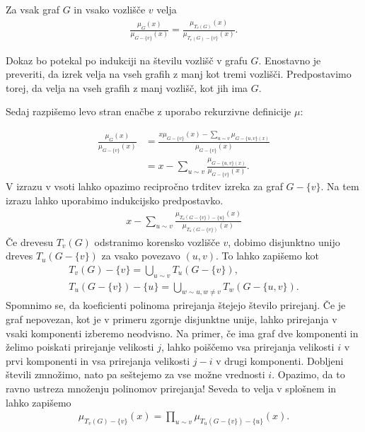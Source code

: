 \begin{lema}\label{lemarekurzpathdrevesa}
    Za vsak graf \(G\) in vsako vozlišče \(v\) velja
    \begin{align*}
        \frac{\mu_G(x)}{\mu_{G-\{v\}}(x)} = \frac{\mu_{T_v(G)}(x)}{\mu_{T_v(G)-\{v\}}(x)}.
    \end{align*}
\end{lema}
\begin{dokaz}
    Dokaz bo potekal po indukciji na številu vozlišč v grafu \(G\). Enostavno je preveriti, da izrek velja na vseh grafih z manj kot tremi vozlišči. Predpostavimo torej, da velja na vseh grafih z manj vozlišč, kot jih ima \(G\).

    Sedaj razpišemo levo stran enačbe z uporabo rekurzivne definicije \(\mu\):

    \begin{align*}
        \frac{\mu_G(x)}{\mu_{G-\{v\}}(x)} & = \frac{x \mu_{G-\{v\}}(x) - \sum_{u\sim v}\mu_{G-\{u, v\}(x)}}{\mu_{G-\{v\}}(x)} \\
                                          & = x - \sum_{u\sim v}\frac{\mu_{G-\{u, v\}(x)}}{\mu_{G-\{v\}}(x)}.
    \end{align*}
    V izrazu v vsoti lahko opazimo recipročno trditev izreka za graf \(G-\{v\}\). Na tem izrazu lahko uporabimo indukcijsko predpostavko.
    \begin{align}\label{lemamatching}
        x - \sum_{u\sim v}\frac{\mu_{T_u(G-\{v\}) - \{u\}}(x)}{\mu_{T_u(G-\{v\})}(x)}
    \end{align}
    Če drevesu \(T_v(G)\) odstranimo korensko vozlišče \(v\), dobimo disjunktno unijo dreves \(T_u(G-\{v\})\) za vsako povezavo \((u, v)\). To lahko zapišemo kot
    \begin{align*}
        T_v(G) - \{v\} = \bigcup_{u\sim v} T_u(G-\{v\}), \\
        T_u(G - \{v\}) - \{u\} = \bigcup_{w\sim u, w\neq v} T_w(G-\{u, v\}).
    \end{align*}
    Spomnimo se, da koeficienti polinoma prirejanja štejejo število prirejanj. Če je graf nepovezan, kot je v primeru zgornje disjunktne unije, lahko prirejanja v vsaki komponenti izberemo neodvisno. Na primer, če ima graf dve komponenti in želimo poiskati prirejanje velikosti \(j\), lahko poiščemo vsa prirejanja velikosti \(i\) v prvi komponenti in vsa prirejanja velikosti \(j-i\) v drugi komponenti. Dobljeni števili zmnožimo, nato pa seštejemo za vse možne vrednosti \(i\). Opazimo, da to ravno ustreza množenju polinomov prirejanja! Seveda to velja v splošnem in lahko zapišemo
    \begin{align*}
        \mu_{T_v(G) - \{v\}}(x) = \prod_{u\sim v} \mu_{T_u(G-\{v\}) - \{u\}}(x).
    \end{align*}


\end{dokaz}
